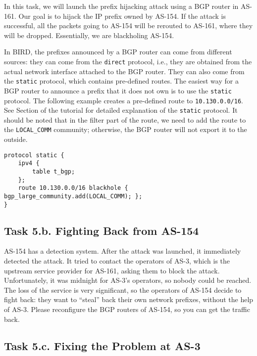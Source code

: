 In this task, we will launch the prefix hijacking attack
using a BGP router in AS-161. Our goal is to hijack
the IP prefix owned by AS-154. If the attack is successful,
all the packets going to AS-154 will be rerouted to AS-161, where
they will be dropped. Essentially, we are blackholing AS-154.

In BIRD, the prefixes announced by a BGP router can come from different 
sources: they can come from the \texttt{direct} protocol, 
i.e., they are obtained from the actual network interface attached
to the BGP router. They can also come from the \texttt{static} protocol,
which contains pre-defined routes. The easiest way for a BGP router to 
announce a prefix that it does not own is to use 
the \texttt{static} protocol. The following  
example creates a pre-defined route to \texttt{10.130.0.0/16}. 
See Section \bgpprotocol of the tutorial for detailed explanation of 
the \texttt{static} protocol.
It should be noted that in the filter part of the route,
we need to add the route to the \texttt{LOCAL\_COMM} community; 
otherwise, the BGP router will not export it to the outside.   

\begin{lstlisting}
protocol static {
    ipv4 {
        table t_bgp;
    };
    route 10.130.0.0/16 blackhole { bgp_large_community.add(LOCAL_COMM); };
}
\end{lstlisting}


\subsection{Task 5.b. Fighting Back from AS-154} 

AS-154 has a detection system. After the attack was launched,
it immediately detected the attack. It tried to contact
the operators of AS-3, which is the upstream service provider for AS-161,
asking them to block the attack. Unfortunately, it was midnight for AS-3's
operators, so nobody could be reached. The loss of the service
is very significant, so the operators of AS-154 decide to 
fight back: they want to ``steal'' back their own network prefixes, without the help
of AS-3. Please reconfigure the BGP routers of AS-154, so 
you can get the traffic back. 


\subsection{Task 5.c. Fixing the Problem at AS-3} 


